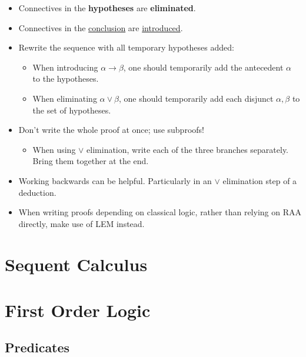 \documentclass{book}
\begin{document}
        \begin{itemize}
            \item Connectives in the {\bf hypotheses} are {\bf eliminated}.            
            \item Connectives in the \underline{conclusion} are \underline{introduced}. 
            \item Rewrite the sequence with all temporary hypotheses added:
                \begin{itemize}
                    \item When introducing $\alpha \to \beta$, one should temporarily add the antecedent $\alpha$ to the hypotheses.
                    \item When eliminating $\alpha \lor \beta$, one should temporarily add each disjunct $\alpha, \beta$ to the set of hypotheses.
                \end{itemize}
            \item Don't write the whole proof at once; use subproofs! 
                \begin{itemize}
                    \item When using $\lor$ elimination, write each of the three branches separately. Bring them together at the end.
                \end{itemize}
            \item Working backwards can be helpful. Particularly in an $\lor$ elimination step of a deduction. 
            \item When writing proofs depending on classical logic, rather than relying on RAA directly, make use of LEM instead.            
        \end{itemize}


    \newpage
    \section{Sequent Calculus}

    \newpage
    \section{First Order Logic}
    
        \subsection{Predicates}

\end{document}
